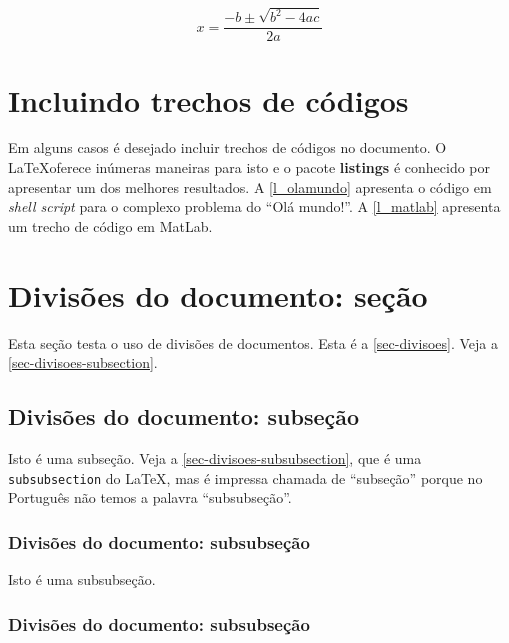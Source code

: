 \begin{equation}
 x=\frac{-b\pm\sqrt{b^2-4ac}}{2a}
\label{e_c2_eq1}
\end{equation}

\section{Incluindo trechos de códigos}

Em alguns casos é desejado incluir trechos de códigos no documento. O \LaTeX oferece inúmeras maneiras para isto e o pacote \textbf{listings} é conhecido por apresentar um dos melhores resultados. A \autoref{l_olamundo} apresenta o código em \textit{shell script} para o complexo problema do ``Olá mundo!''. A \autoref{l_matlab} apresenta um trecho de código em MatLab.






\section{Divisões do documento: seção}\label{sec-divisoes}

Esta seção testa o uso de divisões de documentos. Esta é a
\autoref{sec-divisoes}. Veja a \autoref{sec-divisoes-subsection}.

\subsection{Divisões do documento: subseção}\label{sec-divisoes-subsection}

Isto é uma subseção. Veja a \autoref{sec-divisoes-subsubsection}, que é uma
\texttt{subsubsection} do \LaTeX, mas é impressa chamada de ``subseção'' porque
no Português não temos a palavra ``subsubseção''.

\subsubsection{Divisões do documento: subsubseção}
\label{sec-divisoes-subsubsection}

Isto é uma subsubseção.

\subsubsection{Divisões do documento: subsubseção}

